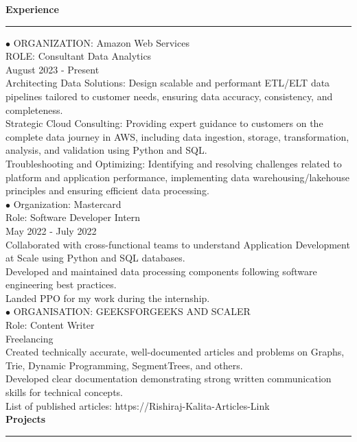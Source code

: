 \documentclass[11pt,a4paper]{article}
\renewcommand{\section}[1]{%
  \vspace{12pt}%
  {\large\bfseries #1}%
  \vspace{6pt}%
  \hrule%
  \vspace{6pt}%
}
\begin{document}
\section{Experience}

\noindent $\bullet$ ORGANIZATION: Amazon Web Services\\[0.2cm]
ROLE: Consultant Data Analytics\\[0.2cm]
August 2023 - Present\\[0.2cm]
Architecting Data Solutions: Design scalable and performant ETL/ELT data pipelines tailored to customer needs, ensuring data accuracy, consistency, and completeness.\\[0.2cm]
Strategic Cloud Consulting: Providing expert guidance to customers on the complete data journey in AWS, including data ingestion, storage, transformation, analysis, and validation using Python and SQL.\\[0.2cm]
Troubleshooting and Optimizing: Identifying and resolving challenges related to platform and application performance, implementing data warehousing/lakehouse principles and ensuring efficient data processing.\\[0.2cm]
\noindent $\bullet$ Organization: Mastercard\\[0.2cm]
Role: Software Developer Intern\\[0.2cm]
May 2022 - July 2022\\[0.2cm]
Collaborated with cross-functional teams to understand Application Development at Scale using Python and SQL databases.\\[0.2cm]
Developed and maintained data processing components following software engineering best practices.\\[0.2cm]
Landed PPO for my work during the internship.\\[0.2cm]
\noindent $\bullet$ ORGANISATION: GEEKSFORGEEKS AND SCALER\\[0.2cm]
Role: Content Writer\\[0.2cm]
Freelancing\\[0.2cm]
Created technically accurate, well-documented articles and problems on Graphs, Trie, Dynamic Programming, SegmentTrees, and others.\\[0.2cm]
Developed clear documentation demonstrating strong written communication skills for technical concepts.\\[0.2cm]
List of published articles: https://Rishiraj-Kalita-Articles-Link\\[0.2cm]
\section{Projects}
\end{document}
